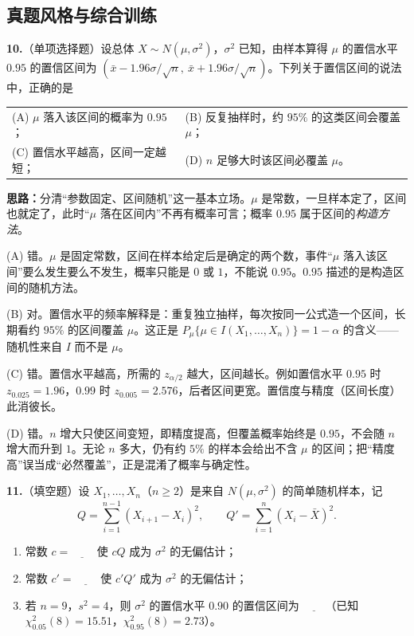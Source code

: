 
\else \answerarea[10] \fi%
\subsection{真题风格与综合训练}

\textbf{10.}（单项选择题）设总体 $X\sim N(\mu,\sigma^{2})$，$\sigma^{2}$ 已知，由样本算得 $\mu$ 的置信水平 $0.95$ 的置信区间为 $(\bar x-1.96\sigma/\sqrt{n},\ \bar x+1.96\sigma/\sqrt{n})$。下列关于置信区间的说法中，正确的是
\begin{center}
\begin{tabular}{ll}
(A) $\mu$ 落入该区间的概率为 $0.95$； & (B) 反复抽样时，约 $95\%$ 的这类区间会覆盖 $\mu$；\\[4pt]
(C) 置信水平越高，区间一定越短； & (D) $n$ 足够大时该区间必覆盖 $\mu$。
\end{tabular}
\end{center}

\ifshowsolutions%
\textbf{思路：}分清“参数固定、区间随机”这一基本立场。$\mu$ 是常数，一旦样本定了，区间也就定了，此时“$\mu$ 落在区间内”不再有概率可言；概率 $0.95$ 属于区间的\emph{构造方法}。

(A) 错。$\mu$ 是固定常数，区间在样本给定后是确定的两个数，事件“$\mu$ 落入该区间”要么发生要么不发生，概率只能是 $0$ 或 $1$，不能说 $0.95$。$0.95$ 描述的是构造区间的随机方法。

(B) 对。置信水平的频率解释是：重复独立抽样，每次按同一公式造一个区间，长期看约 $95\%$ 的区间覆盖 $\mu$。这正是 $P_\mu\{\mu\in I(X_1,\ldots,X_n)\}=1-\alpha$ 的含义——随机性来自 $I$ 而不是 $\mu$。

(C) 错。置信水平越高，所需的 $z_{\alpha/2}$ 越大，区间越长。例如置信水平 $0.95$ 时 $z_{0.025}=1.96$，$0.99$ 时 $z_{0.005}=2.576$，后者区间更宽。置信度与精度（区间长度）此消彼长。

(D) 错。$n$ 增大只使区间变短，即精度提高，但覆盖概率始终是 $0.95$，不会随 $n$ 增大而升到 $1$。无论 $n$ 多大，仍有约 $5\%$ 的样本会给出不含 $\mu$ 的区间；把“精度高”误当成“必然覆盖”，正是混淆了概率与确定性。


\else \answerarea[8] \fi%
\textbf{11.}（填空题）设 $X_1,\ldots,X_n$（$n\geqslant2$）是来自 $N(\mu,\sigma^{2})$ 的简单随机样本，记
\[
Q=\sum_{i=1}^{n-1}(X_{i+1}-X_i)^{2},\qquad
Q'=\sum_{i=1}^{n}(X_i-\bar X)^{2}.
\]
\begin{enumerate}[label=(\arabic*)]
    \item 常数 $c=\underline{\qquad}$ 使 $cQ$ 成为 $\sigma^{2}$ 的无偏估计；
    \item 常数 $c'=\underline{\qquad}$ 使 $c'Q'$ 成为 $\sigma^{2}$ 的无偏估计；
    \item 若 $n=9$，$s^{2}=4$，则 $\sigma^{2}$ 的置信水平 $0.90$ 的置信区间为 $\underline{\qquad}$（已知 $\chi^{2}_{0.05}(8)=15.51$，$\chi^{2}_{0.95}(8)=2.73$）。
\end{enumerate}

